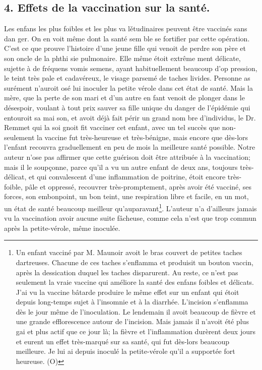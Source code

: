 \subsection{4. Effets de la vaccination sur la santé.}
Les enfans les plus foibles et les plus va lětudinaires peuvent être vaccinés sans dan ger. On en voit même dont la santé sem ble se fortifier par cette opération. C'est ce que prouve l'histoire d'une jeune fille qui venoit de perdre son père et son oncle de la phthi sie pulmonaire. Elle même étoit extrême ment délicate, sujette à de fréquens vomis semens, ayant habituellement beaucoup d'op pression, le teint très pale et cadavéreux, le visage parsemé de taches livides. Personne as surément n'auroit osé lui inoculer la petite vérole dans cet état de santé. Mais la mère, que la perte de son mari et d'un autre en fant venoit de plonger dans le désespoir, voulant à tout prix sauver sa fille unique du danger de l'épidémie qui entouroit sa mai son, et avoit déjà fait périr un grand nom bre d'individus, le Dr. Remmet qui la soi gnoit fit vacciner cet enfant, avec un tel succès\setcounter{page}{383} que non-seulement la vaccine fut très-heureuse et très-bénigne, mais encore que dès-lors l'enfant recouvra graduellement en peu de mois la meilleure santé possible.
Notre auteur n'ose pas affirmer que cette guérison doit être attribuée à la vaccination; mais il le soupçonne, parce qu'il a vu un autre enfant de deux ans, toujours très-délicat, et qui convalescent d'une inflammation de poitrine, étoit encore très-foible, pâle et oppressé, recouvrer très-promptement, après avoir été vacciné, ses forces, son embonpoint, un bon teint, une respiration libre et facile, en un mot, un état de santé beaucoup meilleur qu'auparavant\footnote{Un enfant vacciné par M. Maunoir avoit le bras couvert de petites taches dartreuses. Chacune de ces taches s'enflamma et produisit un bouton vaccin, après la dessication duquel les taches disparurent. Au reste, ce n'est pas seulement la vraie vaccine qui améliore la santé des enfans foibles et délicats. J'ai vu la vaccine bâtarde produire le même effet sur un enfant qui étoit depuis long-temps sujet à l'insomnie et à la diarrhée. L'incision s'enflamma dès le jour même de l'inoculation. Le lendemain il avoit beaucoup de fièvre et une grande efflorescence autour de l'incision. Mais jamais il n'avoit été plus gai et plus actif que ce jour là; la fièvre et l'inflammation durèrent deux jours et eurent un effet très-marqué sur sa santé, qui fut dès-lors beaucoup meilleure. Je lui ai depuis inoculé la petite-vérole qu'il a supportée fort heureuse. (O)}.
\setcounter{page}{384}
L'auteur n'a d'ailleurs jamais vu la vaccination avoir aucune suite fâcheuse, comme cela n'est que trop commun après la petite-vérole, même inoculée.
